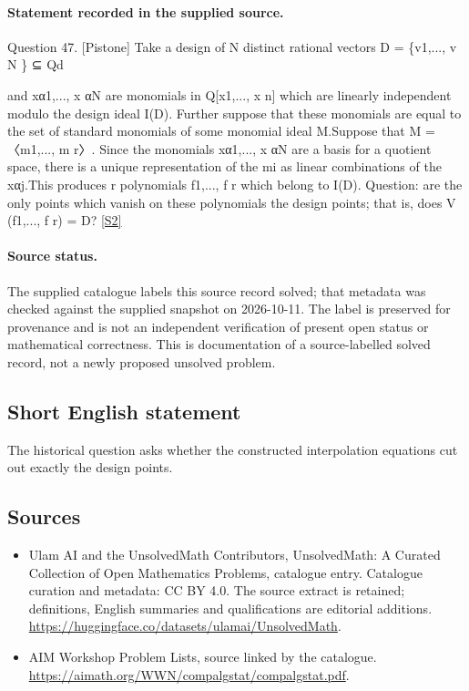 \documentclass[11pt]{article}
\begin{document}
\paragraph{Statement recorded in the supplied source.}
Question 47. [Pistone] Take a design of N distinct rational vectors D = \{v1,..., v N \} ⊆ Qd

and xα1,..., x αN are monomials in Q[x1,..., x n] which are linearly independent modulo the design ideal I(D). Further suppose that these monomials are equal to the set of standard monomials of some monomial ideal M.Suppose that M = 〈m1,..., m r〉. Since the monomials xα1,..., x αN are a basis for a quotient space, there is a unique representation of the mi as linear combinations of the xαj.This produces r polynomials f1,..., f r which belong to I(D). Question: are the only points which vanish on these polynomials the design points; that is, does V (f1,..., f r) = D? \href{https://aimath.org/WWN/compalgstat/compalgstat.pdf}{[S2]}
\paragraph{Source status.}
The supplied catalogue labels this source record solved; that metadata was checked against the supplied snapshot on 2026-10-11. The label is preserved for provenance and is not an independent verification of present open status or mathematical correctness. This is documentation of a source-labelled solved record, not a newly proposed unsolved problem.
\subsection{Short English statement}
The historical question asks whether the constructed interpolation equations cut out exactly the design points.
\subsection{Sources}
\begin{itemize}
\item[S1] Ulam AI and the UnsolvedMath Contributors, UnsolvedMath: A Curated Collection of Open Mathematics Problems, catalogue entry. Catalogue curation and metadata: CC BY 4.0. The source extract is retained; definitions, English summaries and qualifications are editorial additions.
\url{https://huggingface.co/datasets/ulamai/UnsolvedMath}.
\item[S2] AIM Workshop Problem Lists, source linked by the catalogue.
\url{https://aimath.org/WWN/compalgstat/compalgstat.pdf}.
\end{itemize}
\end{document}
